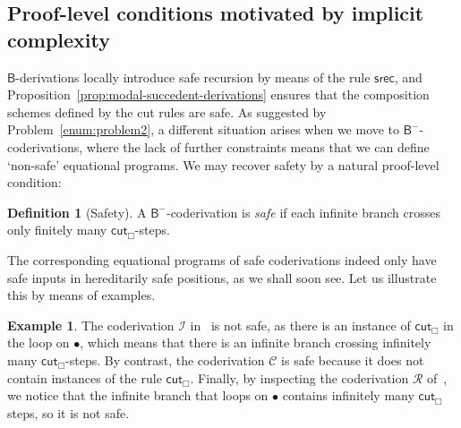 \documentclass[manuscript,screen]{acmart}
\newcommand{\anupam}[1]{\todo{A: #1}}
\theoremstyle{definition}
\newtheorem{defn}[thm]{Definition}
\newtheorem{exmp}[thm]{Example}
\theoremstyle{remark}
\newcommand{\sq}{\Box}
\newcommand{\cconc}{\mathcal{C}}
\newcommand{\incrementation}{\mathcal{I}}
\newcommand{\primrec}{\mathcal{R}}
\newcommand{\saferec}{\mathsf{srec}}
\newcommand{\bc}{\mathsf{B}}
\newcommand{\bcnorec}{\bc^{-}}
\newcommand{\cut}{\mathsf{cut}}
\begin{document}
\subsection{Proof-level conditions motivated by implicit complexity}\label{sec:Proof-level conditions motivated by implicit complexity}
$\bc$-derivations  locally introduce safe recursion  by means of the rule $\saferec$, and Proposition~\ref{prop:modal-succedent-derivations} ensures that the composition schemes defined by the cut rules are safe. As suggested by Problem~\ref{enum:problem2}, a different situation arises when we move to   $\bcnorec$-coderivations, where the lack of further constraints 
means that we can define `non-safe' equational programs.
We may recover safety by a natural proof-level condition:



\begin{defn}
[Safety]
\label{defn:safety}
A $\bcnorec$-coderivation is \emph{safe} if each infinite branch crosses only finitely many $\cut_\sq$-steps.
\end{defn}

The corresponding equational programs of safe coderivations indeed only have safe inputs in hereditarily safe positions, as we shall soon see.
Let us illustrate this by means of examples.

\begin{exmp}
The coderivation $\incrementation$ in~ is not safe, as there is an instance of $\cut_{\sq}$ in the loop on $\bullet$, which means that there is an infinite branch crossing infinitely many $\cut_{\sq}$-steps. By contrast,  the coderivation  $\cconc$ is safe because it does not contain instances of the rule $\cut_\sq$.  Finally, by inspecting the coderivation $\primrec$  of~, we notice that the infinite branch that loops on $\bullet$  contains infinitely many $\cut_{\sq}$ steps, 
so it  is not safe.
\end{exmp}
\end{document}
